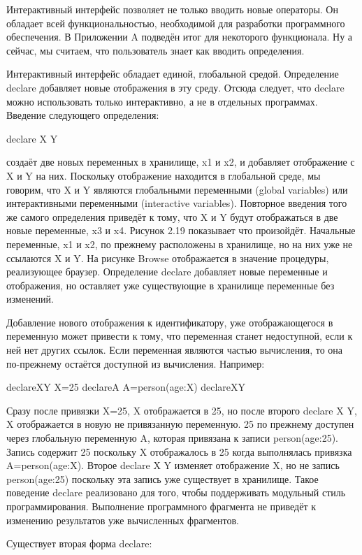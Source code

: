 Интерактивный интерфейс позволяет не только вводить новые операторы. Он обладает всей функциональностью, необходимой для разработки программного обеспечения. В Приложении A подведён итог для некоторого функционала. Ну а сейчас, мы считаем, что пользователь знает как вводить определения.

Интерактивный интерфейс обладает единой, глобальной средой. Определение declare добавляет новые отображения в эту среду. Отсюда следует, что declare можно использовать только интерактивно, а не в отдельных программах. Введение следующего определения:

declare X Y

создаёт две новых переменных в хранилище, x1 и x2, и добавляет отображение с X и Y на них. Поскольку отображение находится в глобальной среде, мы говорим, что X и Y являются глобальными переменными (global variables) или интерактивными переменными (interactive variables). Повторное введения того же самого определения приведёт к тому, что X и Y будут отображаться в две новые переменные, x3 и x4. Рисунок 2.19 показывает что произойдёт. Начальные переменные, x1 и x2, по прежнему расположены в хранилище, но на них уже не ссылаются X и Y. На рисунке Browse отображается в значение процедуры, реализующее браузер. Определение declare добавляет новые переменные и отображения, но оставляет уже существующие в хранилище переменные без изменений.

Добавление нового отображения к идентификатору, уже отображающегося в переменную может привести к тому, что переменная станет недоступной, если к ней нет других ссылок. Если переменная являются частью вычисления, то она по-прежнему остаётся доступной из вычисления. Например:

declareXY
X=25
declareA
A=person(age:X)
declareXY

Сразу после привязки X=25, X отображается в 25, но после второго declare X Y, X отображается в новую не привязанную переменную. 25 по прежнему доступен через глобальную переменную A, которая привязана к записи person(age:25). Запись содержит 25 поскольку X отображалось в 25 когда выполнялась привязка A=person(age:X). Второе declare X Y изменяет отображение X, но не запись person(age:25) поскольку эта запись уже существует в хранилище. Такое поведение declare реализовано для того, чтобы поддерживать модульный стиль программирования. Выполнение программного фрагмента не приведёт к изменению результатов уже вычисленных фрагментов.

Существует вторая форма declare:

